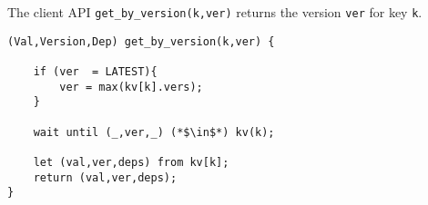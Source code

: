 The client API \verb|get_by_version(k,ver)| returns the version \verb|ver| for key \verb|k|.

\begin{lstlisting}[caption={Replica API for read},label={lst:cops-replica-read}]
(Val,Version,Dep) get_by_version(k,ver) {

    if (ver  = LATEST){
        ver = max(kv[k].vers);
    }

    wait until (_,ver,_) (*$\in$*) kv(k);
    
    let (val,ver,deps) from kv[k];
    return (val,ver,deps);
}
\end{lstlisting}
